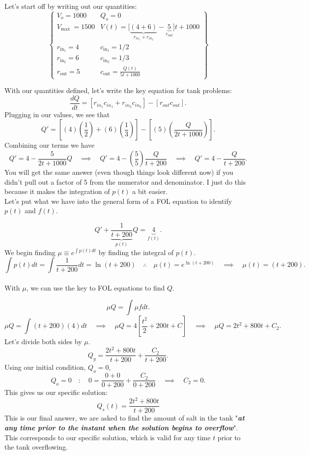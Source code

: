 \documentclass[a4paper,12pt]{article} %
\begin{document}
Let's start off by writing out our quantities:
$$
\left\{
\begin{array}{ll}
V_{o}=1000 & Q_o=0 \\
V_{\text {max }}=1500 & V(t)=\bigg[\underbrace{(4 + 6)}_{r_{in_1} + r_{in_{2}}} - \underbrace{5}_{r_{out}}\bigg]t+1000 \\
r_{\text {in}_1}=4 & c_{\text{in}_1} = 1/2 \\
r_{\text {in}_2}=6 & c_{\text{in}_2} = 1/3\\
r_{\text{out}}=5 & c_{\text{out}} = \frac{Q(t)}{5t + 1000}
\end{array}
\right\}
$$

With our quantities defined, let's write the key equation for tank problems:
$$ \frac{dQ}{dt} = \left[r_{in_1}c_{in_1} + r_{in_2}c_{in_2}\right] - \left[r_{out}c_{out}\right]. $$
Plugging in our values, we see that
$$ Q' = \left[(4)\left(\frac{1}{2}\right) + (6)\left(\frac{1}{3}\right)\right] - \left[(5)\left(\frac{Q}{2t + 1000}\right)\right]. $$
Combining our terms we have
$$ Q' = 4 - \frac{5}{2t + 1000}Q \quad\implies\quad Q' = 4 - \left(\frac{5}{5}\right)\frac{Q}{t + 200} \quad\implies\quad Q' = 4 - \frac{Q}{t + 200}.$$
You will get the same answer (even though things look different now) if you didn't pull out a factor of 5 from the numerator and denominator. I just do this because it makes the integration of $p(t)$ a bit easier.\\

Let's put what we have into the general form of a FOL equation to identify $p(t)$ and $f(t)$.

$$ Q' + \underbrace{\frac{1}{t + 200}}_{p(t)}Q = \underbrace{4}_{f(t)}. $$
We begin finding $\mu \equiv e^{\int p(t)dt}$ by finding the integral of $p(t)$.
$$ \int p(t)dt = \int \frac{1}{t + 200}dt = \ln{(t + 200)} \quad\therefore\quad \mu(t) = e^{\ln{(t + 200)}} \quad\implies\quad \mu(t) = (t + 200). $$\\

With $\mu$, we can use the key to FOL equations to find $Q$.

$$ \mu Q = \int \mu f dt .$$
$$ \mu Q = \int (t+200)(4)dt \quad\implies\quad \mu Q = 4\left[\frac{t^2}{2} + 200t + C\right] \quad\implies\quad \mu Q = 2t^2 + 800t + C_2 . $$
Let's divide both sides by $\mu$.
$$ Q_g = \frac{2t^2 + 800t}{t + 200} + \frac{C_2}{t + 200}. $$
Using our initial condition, $Q_o = 0$,
$$ Q_o = 0 \quad:\quad 0 = \frac{0 + 0}{0 +200} + \frac{C_2}{0 +200} \quad\implies\quad C_2 = 0. $$
This gives us our specific solution:
$$ \boxed{Q_s(t) = \frac{2t^2 + 800t}{t + 200}} $$
This is our final answer, we are asked to find the amount of salt in the tank "\textit{\textbf{at any time prior to the instant when the solution begins to overflow}}". This corresponds to our specific solution, which is valid for any time $t$ prior to the tank overflowing.
\end{document}
